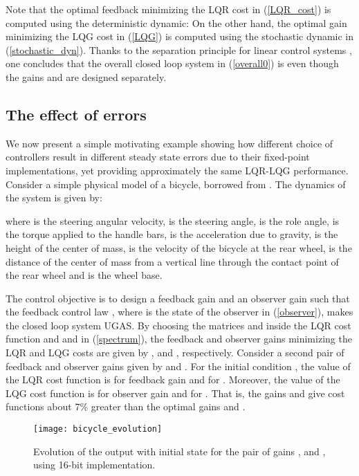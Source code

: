 \documentclass{amsart}
\numberwithin{equation}{section}
\def\myparagraph#1{{\smallskip\noindent{\bf #1}}}
\begin{document}
Note that the optimal feedback  minimizing the LQR cost in (\ref{LQR_cost}) is computed using the deterministic dynamic:  On the other hand, the optimal gain  minimizing the LQG cost in (\ref{LQG}) is computed using the stochastic dynamic in (\ref{stochastic_dyn}). Thanks to the separation principle for linear control systems \cite{joao}, one concludes that the overall closed loop system in (\ref{overall0}) is  even though the gains  and  are designed separately.

\subsection{The effect of errors}

\myparagraph{Example}
We now present a simple motivating example showing how different choice of
controllers result in different steady state errors due to their fixed-point implementations, 
yet providing approximately the same LQR-LQG performance. 
Consider a simple physical model of a bicycle, borrowed from \cite{astrom}. 
The dynamics of the system is given by:

where  is the steering angular velocity,  is the steering angle,  is the role angle,  is the torque applied to the handle bars, 
 is the acceleration due to gravity,  is the height of the center of mass, 
 is the velocity of the bicycle at the rear wheel, 
 is the distance of the center of mass from a vertical line through the contact point of the rear wheel and  is the wheel base. 

The control objective is to design a feedback gain  and an observer gain  such that the feedback control law , 
where \mbox{} is the state of the observer in (\ref{observer}), 
makes the closed loop system UGAS. 
By choosing the matrices  and  inside the LQR cost function and  and  in (\ref{spectrum}), 
the feedback and observer gains minimizing the LQR and LQG costs are given by , and , respectively. 
Consider a second pair of feedback and observer gains given by  and . 
For the initial condition , the value of the LQR cost function is  for feedback gain  and 
 for . 
Moreover, the value of the LQG cost function is  for observer gain  and  for . 
That is, the gains  and  give cost functions about 7\% greater than the optimal gains  and .

\begin{figure}
  \centering\texttt{[image: bicycle\_evolution]}
  \caption{Evolution of the output  with initial state  for the pair of gains ,  and ,  using 16-bit implementation.}
\label{fig1}
\end{figure}
\end{document}
